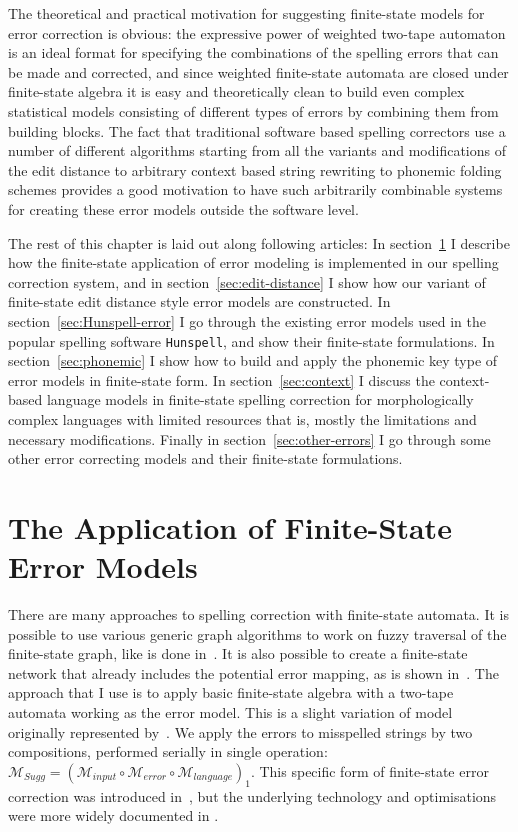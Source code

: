 \documentclass[officiallayout]{unihelcompling}
\begin{document}
The theoretical and practical motivation for suggesting finite-state models for
error correction is obvious: the expressive power of weighted two-tape
automaton is an ideal format for specifying the combinations of the spelling
errors that can be made and corrected, and since weighted finite-state automata
are closed under finite-state algebra it is easy and theoretically clean to
build even complex statistical models consisting of different types of errors
by combining them from building blocks. The fact that traditional software
based spelling correctors use a number of different algorithms starting from
all the variants and modifications of the edit distance to arbitrary context
based string rewriting to phonemic folding schemes provides a good motivation
to have such arbitrarily combinable systems for creating these error models
outside the software level.

The rest of this chapter is laid out along following articles: In
section~\ref{sec:error-application} I describe how the finite-state application
of error modeling is implemented in our spelling correction system, and in
section~\ref{sec:edit-distance} I show how our variant of finite-state edit
distance style error models are constructed.  In
section~\ref{sec:Hunspell-error} I go through the existing error models used in
the popular spelling software \texttt{Hunspell}, and show their finite-state
formulations. In section~\ref{sec:phonemic} I show how to build and apply
the phonemic key type of error models in finite-state form. 
In section~\ref{sec:context} I discuss the context-based language models in
finite-state spelling correction for morphologically complex languages with
limited resources that is, mostly the limitations and necessary modifications.
Finally in section~\ref{sec:other-errors} I go through some other error
correcting models and their finite-state formulations.

\section{The Application of Finite-State Error Models}
\label{sec:error-application}

There are many approaches to spelling correction with finite-state automata.
It is possible to use various generic graph algorithms to work on fuzzy
traversal of the finite-state graph, like is done in~\citet{hulden2009fast}.
It is also possible to create a finite-state network that already includes the
potential error mapping, as is shown in~\citet{schulz2002fast}. The approach
that I use is to apply basic finite-state algebra with a two-tape automata
working as the error model. This is a slight variation of model originally
represented by~\citet{mohri2003edit}. We apply the errors to
misspelled strings by two compositions, performed serially in single operation:
$\mathcal{M}_{Sugg} = (\mathcal{M}_{input} \circ \mathcal{M}_{error} \circ
\mathcal{M}_{language})_1$.  This specific form of finite-state error
correction was introduced in~, but the
underlying technology and optimisations were more widely documented in
\citet{linden2011hfst}.
\end{document}
